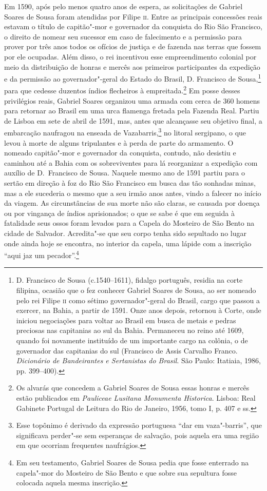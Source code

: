 Em 1590, após pelo menos quatro anos de espera, as solicitações de
Gabriel Soares de Sousa foram atendidas por Filipe \textsc{ii}. Entre as
principais concessões reais estavam o título de capitão"-mor e
governador da conquista do Rio São Francisco, o direito de nomear seu
sucessor em caso de falecimento e a permissão para prover por três anos
todos os ofícios de justiça e de fazenda nas terras que fossem por ele
ocupadas. Além disso, o rei incentivou esse empreendimento colonial por
meio da distribuição de honras e mercês aos primeiros participantes da
expedição e da permissão ao governador"-geral do Estado do Brasil, D.
Francisco de Sousa,\footnote{ D. Francisco de Sousa (c.1540--1611),
fidalgo português, residia na corte filipina, ocasião que o fez
conhecer Gabriel Soares de Sousa, ao ser nomeado pelo rei Filipe 	\textsc{ii}
como sétimo governador"-geral do Brasil, cargo que passou a exercer, na
Bahia, a partir de 1591. Onze anos depois, retornou à Corte, onde
iniciou negociações para voltar ao Brasil em busca de metais e pedras
preciosas nas capitanias ao sul da Bahia. Permaneceu no reino até 1609,
quando foi novamente instituído de um importante cargo na colônia, o de
governador das capitanias do sul (Francisco de Assis Carvalho Franco.
\textit{Dicionário de Bandeirantes e Sertanistas do Brasil}. São Paulo:
Itatiaia, 1986, pp. 399--400).} para que cedesse duzentos índios
flecheiros à empreitada.\footnote{ Os alvarás que concedem a Gabriel
Soares de Sousa essas honras e mercês estão publicados em\textit{
Pauliceae Lusitana Monumenta Historica}. Lisboa: Real Gabinete Portugal
de Leitura do Rio de Janeiro, 1956, tomo I, p. 407 e ss.} Em posse
desses privilégios reais, Gabriel Soares organizou uma armada com cerca
de 360 homens para retornar ao Brasil em uma urca
flamenga fretada pela Fazenda Real. Partiu de Lisboa em sete de abril
de 1591, mas, antes que alcançasse seu objetivo final, a embarcação
naufragou na enseada de Vazabarris,\footnote{ Esse topônimo é derivado
da expressão portuguesa “dar em vaza"-barris”, que significava perder"-se
sem esperanças de salvação, pois aquela era uma região em que ocorriam
frequentes naufrágios.} no litoral sergipano, o que levou à morte de
alguns tripulantes e à perda de parte do armamento. O nomeado
capitão"-mor e governador da conquista, contudo, não desistiu e caminhou
até a Bahia com os sobreviventes para lá reorganizar a expedição com
auxílio de D.~Francisco de Sousa. Naquele mesmo ano de 1591 partiu para
o sertão em direção à foz do Rio São Francisco em busca das tão
sonhadas minas, mas a ele sucederia o mesmo que a seu irmão anos antes,
vindo a falecer no início da viagem. As circunstâncias de sua morte não
são claras, se causada por doença ou por vingança de índios
aprisionados; o que se sabe é que em seguida à fatalidade seus ossos
foram levados para a Capela do Mosteiro de São Bento na cidade de
Salvador. Acredita"-se que seu corpo tenha sido sepultado no lugar onde
ainda hoje se encontra, no interior da capela, uma lápide com a
inscrição ``aqui jaz um pecador''.\footnote{ Em seu
testamento, Gabriel Soares de Sousa pedia que fosse enterrado na 
capela"-mor do Mosteiro de São Bento e que sobre sua sepultura fosse colocada
aquela mesma inscrição.}

